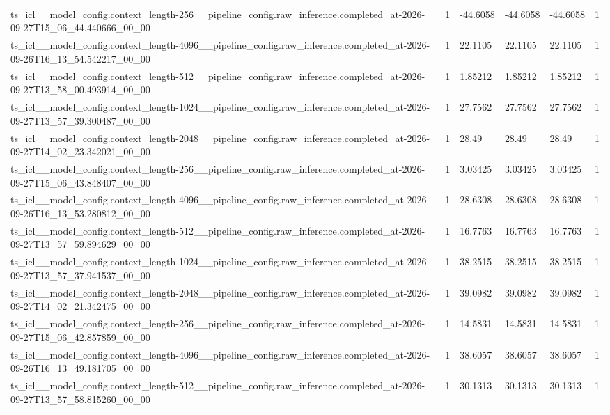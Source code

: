 \begin{tabular}{llllll}
ts\_icl\_\_model\_config.context\_length-256\_\_pipeline\_config.raw\_inference.completed\_at-2026-09-27T15\_06\_44.440666\_00\_00 & 1 & -44.6058 & -44.6058 & -44.6058 & 1 \\
ts\_icl\_\_model\_config.context\_length-4096\_\_pipeline\_config.raw\_inference.completed\_at-2026-09-26T16\_13\_54.542217\_00\_00 & 1 & 22.1105 & 22.1105 & 22.1105 & 1 \\
ts\_icl\_\_model\_config.context\_length-512\_\_pipeline\_config.raw\_inference.completed\_at-2026-09-27T13\_58\_00.493914\_00\_00 & 1 & 1.85212 & 1.85212 & 1.85212 & 1 \\
ts\_icl\_\_model\_config.context\_length-1024\_\_pipeline\_config.raw\_inference.completed\_at-2026-09-27T13\_57\_39.300487\_00\_00 & 1 & 27.7562 & 27.7562 & 27.7562 & 1 \\
ts\_icl\_\_model\_config.context\_length-2048\_\_pipeline\_config.raw\_inference.completed\_at-2026-09-27T14\_02\_23.342021\_00\_00 & 1 & 28.49 & 28.49 & 28.49 & 1 \\
ts\_icl\_\_model\_config.context\_length-256\_\_pipeline\_config.raw\_inference.completed\_at-2026-09-27T15\_06\_43.848407\_00\_00 & 1 & 3.03425 & 3.03425 & 3.03425 & 1 \\
ts\_icl\_\_model\_config.context\_length-4096\_\_pipeline\_config.raw\_inference.completed\_at-2026-09-26T16\_13\_53.280812\_00\_00 & 1 & 28.6308 & 28.6308 & 28.6308 & 1 \\
ts\_icl\_\_model\_config.context\_length-512\_\_pipeline\_config.raw\_inference.completed\_at-2026-09-27T13\_57\_59.894629\_00\_00 & 1 & 16.7763 & 16.7763 & 16.7763 & 1 \\
ts\_icl\_\_model\_config.context\_length-1024\_\_pipeline\_config.raw\_inference.completed\_at-2026-09-27T13\_57\_37.941537\_00\_00 & 1 & 38.2515 & 38.2515 & 38.2515 & 1 \\
ts\_icl\_\_model\_config.context\_length-2048\_\_pipeline\_config.raw\_inference.completed\_at-2026-09-27T14\_02\_21.342475\_00\_00 & 1 & 39.0982 & 39.0982 & 39.0982 & 1 \\
ts\_icl\_\_model\_config.context\_length-256\_\_pipeline\_config.raw\_inference.completed\_at-2026-09-27T15\_06\_42.857859\_00\_00 & 1 & 14.5831 & 14.5831 & 14.5831 & 1 \\
ts\_icl\_\_model\_config.context\_length-4096\_\_pipeline\_config.raw\_inference.completed\_at-2026-09-26T16\_13\_49.181705\_00\_00 & 1 & 38.6057 & 38.6057 & 38.6057 & 1 \\
ts\_icl\_\_model\_config.context\_length-512\_\_pipeline\_config.raw\_inference.completed\_at-2026-09-27T13\_57\_58.815260\_00\_00 & 1 & 30.1313 & 30.1313 & 30.1313 & 1 \\

\end{tabular}
